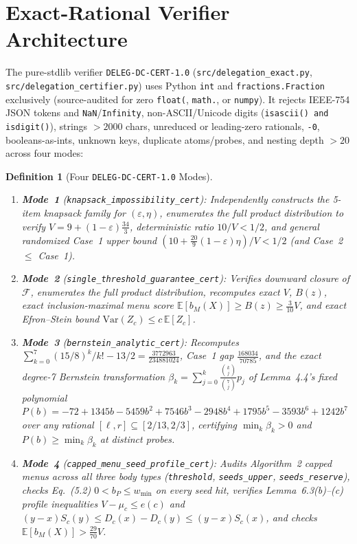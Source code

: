 \documentclass[10pt,twocolumn]{article}
\newtheorem{definition}{Definition}
\begin{document}
\section{Exact-Rational Verifier Architecture}\label{sec:cert}
The pure-stdlib verifier \texttt{DELEG-DC-CERT-1.0} (\texttt{src/delegation\_exact.py}, \texttt{src/delegation\_certifier.py}) uses Python \texttt{int} and \texttt{fractions.Fraction} exclusively (source-audited for zero \texttt{float(}, \texttt{math.}, or \texttt{numpy}). It rejects IEEE-754 JSON tokens and \texttt{NaN}/\texttt{Infinity}, non-ASCII/Unicode digits (\texttt{isascii() and isdigit()}), strings $>2000$ chars, unreduced or leading-zero rationals, \texttt{-0}, booleans-as-ints, unknown keys, duplicate atoms/probes, and nesting depth $>20$ across four modes:
\begin{definition}[Four \texttt{DELEG-DC-CERT-1.0} Modes]\label{def:modes}
\leavevmode
\begin{enumerate}[leftmargin=*,nosep]
  \item \textbf{Mode~1} (\texttt{knapsack\_impossibility\_cert}): Independently constructs the 5-item knapsack family for $(\varepsilon, \eta)$, enumerates the full product distribution to verify $V = 9 + (1-\varepsilon)\frac{34}{3}$, deterministic ratio $10/V < 1/2$, and general randomized Case~1 upper bound $(10 + \frac{20}{9}(1-\varepsilon)\eta)/V < 1/2$ (and Case~2 $\le$ Case~1).
  \item \textbf{Mode~2} (\texttt{single\_threshold\_guarantee\_cert}): Verifies downward closure of $\mathcal{F}$, enumerates the full product distribution, recomputes exact $V$, $B(z)$, exact inclusion-maximal menu score $\mathbb{E}[b_M(X)] \ge B(z) \ge \frac{3}{10}V$, and exact Efron--Stein bound $\mathrm{Var}(Z_c) \le c\,\mathbb{E}[Z_c]$.
  \item \textbf{Mode~3} (\texttt{bernstein\_analytic\_cert}): Recomputes $\sum_{k=0}^7 (15/8)^k/k! - 13/2 = \frac{3772963}{234881024}$, Case~1 gap $\frac{168034}{70785}$, and the exact degree-7 Bernstein transformation $\beta_k = \sum_{j=0}^k \frac{\binom{k}{j}}{\binom{7}{j}} p_j$ of Lemma~4.4's fixed polynomial $P(b) = -72 + 1345b - 5459b^2 + 7546b^3 - 2948b^4 + 1795b^5 - 3593b^6 + 1242b^7$ over any rational $[\ell, r] \subseteq [2/13, 2/3]$, certifying $\min_k \beta_k > 0$ and $P(b) \ge \min_k \beta_k$ at distinct probes.
  \item \textbf{Mode~4} (\texttt{capped\_menu\_seed\_profile\_cert}): Audits Algorithm~2 capped menus across all three body types (\texttt{threshold}, \texttt{seeds\_upper}, \texttt{seeds\_reserve}), checks Eq.~(5.2) $0 < b_P \le w_{\min}$ on every seed hit, verifies Lemma~6.3(b)--(c) profile inequalities $V - \mu_c \le e(c)$ and $(y-x)S_c(y) \le D_c(x)-D_c(y) \le (y-x)S_c(x)$, and checks $\mathbb{E}[b_M(X)] > \frac{29}{70} V$.
\end{enumerate}
\end{definition}
\end{document}
